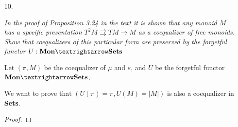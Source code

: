 \documentclass[a4paper,notitlepage]{article}
\begin{document}
\begin{enumerate}
\begin{proof}
\begin{itemize}
        \begin{align*}
           \bar{h}(xy) &= h(i(x·y))                                         \tag{definition of $\bar{h}$} \\
         &= h(\langle x·y \rangle)                            \tag{definition of $i$}  \\
         &= h(μ(\langle \langle x, y \rangle \rangle))        \tag{definition of $μ$} \\
         &= h(ε(\langle \langle x, y \rangle \rangle))        \tag{$h \circ μ = h \circ ε$} \\
         &= h(\langle x, y \rangle))                       \tag{definition of $ε$} \\
         &= h(\langle x \rangle \cdot \langle y \rangle)      \tag{definition of the free monoid} \\
         &= h(\langle x \rangle) \cdot h(\langle y \rangle)  \tag{$h$ is an homomorfism} \\
         &= h(i(x)) \cdot h(i(y))                                    \tag{definition of $i$} \\
         &= \bar{h}(x) \cdot \bar{h}(y)                              \tag{definition of $\bar{h}$} \\
         \end{align*}

     \end{itemize}
    \end{proof}

  \item[10.]

    {\em In the proof of Proposition 3.24 in the text it is shown that any monoid
     $M$ has a specific presentation $T^2 M \rightrightarrows T M → M$ as a coequalizer of free
     monoids. Show that coequalizers of this particular form are preserved by
     the forgetful functor $U : \text{\bf Mon} → \text{\bf Sets}$}

        Let $(\pi,M)$ be the coequalizer of $μ$ and $ε$, and $U$ be the
        forgetful functor $\text{\bf Mon} → \text{\bf Sets}$.

        We want to prove that $(U(\pi) = \pi, U(M) = \vert M \vert)$ is also a coequalizer in {\bf Sets}.

        \begin{proof}

\end{proof}
\end{enumerate}
\end{document}
